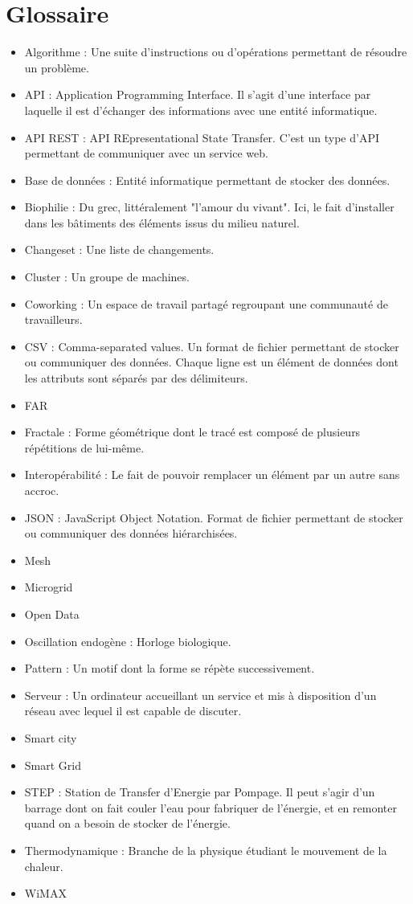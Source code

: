 \chapter*{Glossaire}

\begin{itemize}
    \item Algorithme : Une suite d'instructions ou d'opérations permettant de résoudre un problème.
    \item API : Application Programming Interface. Il s'agit d'une interface par laquelle
il est d'échanger des informations avec une entité informatique.
    \item API REST : API REpresentational State Transfer.
C'est un type d'API permettant de communiquer avec un service web.
    \item Base de données : Entité informatique permettant de stocker des données.
    \item Biophilie : Du grec, littéralement "l'amour du vivant".
Ici, le fait d'installer dans les bâtiments des éléments issus du milieu naturel.
    \item Changeset : Une liste de changements.
    \item Cluster : Un groupe de machines.
    \item Coworking : Un espace de travail partagé regroupant une communauté de travailleurs.
    \item CSV : Comma-separated values. Un format de fichier permettant de stocker ou communiquer des données.
Chaque ligne est un élément de données dont les attributs sont séparés par des délimiteurs.
    \item FAR
    \item Fractale : Forme géométrique dont le tracé est composé de plusieurs répétitions de lui-même.
    \item Interopérabilité : Le fait de pouvoir remplacer un élément par un autre sans accroc.
    \item JSON : JavaScript Object Notation. Format de fichier permettant de stocker ou communiquer des données hiérarchisées.
    \item Mesh
    \item Microgrid
    \item Open Data
    \item Oscillation endogène : Horloge biologique.
    \item Pattern : Un motif dont la forme se répète successivement.
    \item Serveur : Un ordinateur accueillant un service et mis à disposition d'un réseau avec lequel il est capable de discuter.
    \item Smart city
    \item Smart Grid
    \item STEP : Station de Transfer d'Energie par Pompage.
Il peut s'agir d'un barrage dont on fait couler l'eau pour fabriquer de l'énergie, et en remonter quand on a besoin de stocker de l'énergie.
    \item Thermodynamique : Branche de la physique étudiant le mouvement de la chaleur.
    \item WiMAX
\end{itemize}


